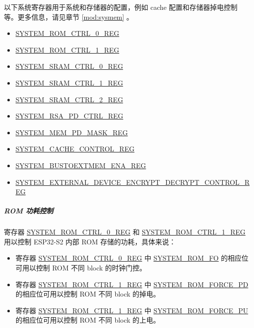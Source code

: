 \documentclass[main\_\_CN.tex]{subfiles}
\begin{document}
以下系统寄存器用于系统和存储器的配置，例如 cache 配置和存储器掉电控制等。更多信息，请见章节 \ref{mod:sysmem} \textit{}。
\begin{itemize}
    \item \hyperref[regdesc:SYSTEMROMCTRL0REG]{SYSTEM\_ROM\_CTRL\_0\_REG}
    \item \hyperref[regdesc:SYSTEMROMCTRL1REG]{SYSTEM\_ROM\_CTRL\_1\_REG}
    \item \hyperref[regdesc:SYSTEMSRAMCTRL0REG]{SYSTEM\_SRAM\_CTRL\_0\_REG}
    \item \hyperref[regdesc:SYSTEMSRAMCTRL1REG]{SYSTEM\_SRAM\_CTRL\_1\_REG}
    \item \hyperref[regdesc:SYSTEMSRAMCTRL2REG]{SYSTEM\_SRAM\_CTRL\_2\_REG}
    \item \hyperref[regdesc:SYSTEMRSAPDCTRLREG]{SYSTEM\_RSA\_PD\_CTRL\_REG}
    \item \hyperref[regdesc:SYSTEMMEMPDMASKREG]{SYSTEM\_MEM\_PD\_MASK\_REG}
    \item \hyperref[regdesc:SYSTEMCACHECONTROLREG]{SYSTEM\_CACHE\_CONTROL\_REG}
    \item \hyperref[fielddesc:SYSTEMBUSTOEXTMEMENA]{SYSTEM\_BUSTOEXTMEM\_ENA\_REG}
    \item \hyperref[regdesc:SYSTEMEXTERNALDEVICEENCRYPTDECRYPTCONTROLREG]{SYSTEM\_EXTERNAL\_DEVICE\_ENCRYPT\_DECRYPT\_CONTROL\_REG}
\end{itemize}

\subparagraph{ROM 功耗控制}

寄存器 \hyperref[regdesc:SYSTEMROMCTRL0REG]{SYSTEM\_ROM\_CTRL\_0\_REG} 和 \hyperref[regdesc:SYSTEMROMCTRL1REG]{SYSTEM\_ROM\_CTRL\_1\_REG} 用以控制 ESP32-S2 内部 ROM 存储的功耗，具体来说：

\begin{itemize}
    \item 寄存器 \hyperref[regdesc:SYSTEMROMCTRL0REG]{SYSTEM\_ROM\_CTRL\_0\_REG} 中 \hyperref[fielddesc:SYSTEMROMFO]{SYSTEM\_ROM\_FO} 的相应位可用以控制 ROM 不同 block 的时钟门控。
    \item 寄存器 \hyperref[regdesc:SYSTEMROMCTRL1REG]{SYSTEM\_ROM\_CTRL\_1\_REG} 中 \hyperref[fielddesc:SYSTEMROMFORCEPD]{SYSTEM\_ROM\_FORCE\_PD} 的相应位可用以控制 ROM 不同 block 的掉电。
    \item 寄存器 \hyperref[regdesc:SYSTEMROMCTRL1REG]{SYSTEM\_ROM\_CTRL\_1\_REG} 中 \hyperref[fielddesc:SYSTEMROMFORCEPU]{SYSTEM\_ROM\_FORCE\_PU} 的相应位可用以控制 ROM 不同 block 的上电。
\end{itemize}
\end{document}
